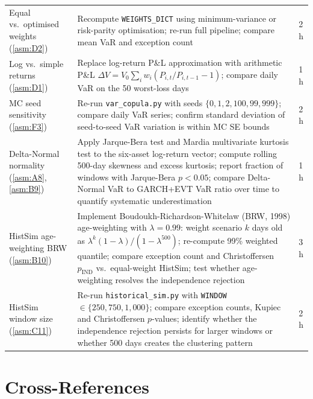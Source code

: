 \documentclass[11pt,a4paper]{article}
\newcommand{\code}[1]{\texttt{#1}}
\begin{document}
\begin{tabularx}{\textwidth}{@{}p{3.8cm} X p{2.0cm}@{}}
Equal vs.\ optimised weights (\cref{asm:D2}) &
Recompute \code{WEIGHTS\_DICT} using minimum-variance or risk-parity
optimisation; re-run full pipeline; compare mean VaR and exception count &
2 h \\[4pt]

Log vs.\ simple returns (\cref{asm:D1}) &
Replace log-return P\&L approximation with arithmetic P\&L
$\Delta V = V_0 \sum_i w_i (P_{i,t}/P_{i,t-1} - 1)$;
compare daily VaR on the 50 worst-loss days &
1 h \\[4pt]

MC seed sensitivity (\cref{asm:F3}) &
Re-run \code{var\_copula.py} with seeds
$\{0, 1, 2, 100, 99{,}999\}$; compare daily VaR series;
confirm standard deviation of seed-to-seed VaR variation
is within MC SE bounds &
2 h \\[4pt]

Delta-Normal normality (\cref{asm:A8}, \cref{asm:B9}) &
Apply Jarque-Bera test and Mardia multivariate kurtosis test to the
six-asset log-return vector; compute rolling 500-day skewness and
excess kurtosis; report fraction of windows with Jarque-Bera
$p < 0.05$; compare Delta-Normal VaR to GARCH+EVT VaR ratio over time
to quantify systematic underestimation &
1 h \\[4pt]

HistSim age-weighting BRW (\cref{asm:B10}) &
Implement Boudoukh-Richardson-Whitelaw (BRW, 1998) age-weighting with
$\lambda = 0.99$: weight scenario $k$ days old as
$\lambda^k (1-\lambda)/(1-\lambda^{500})$; re-compute 99\% weighted
quantile; compare exception count and Christoffersen $p_\mathrm{IND}$
vs.\ equal-weight HistSim; test whether age-weighting resolves the
independence rejection &
3 h \\[4pt]

HistSim window size (\cref{asm:C11}) &
Re-run \code{historical\_sim.py} with \code{WINDOW} $\in \{250, 750, 1{,}000\}$;
compare exception counts, Kupiec and Christoffersen $p$-values; identify
whether the independence rejection persists for larger windows or
whether 500 days creates the clustering pattern &
2 h \\[4pt]

\bottomrule
\end{tabularx}

\section{Cross-References}\label{sec:cross-references}
\end{document}
